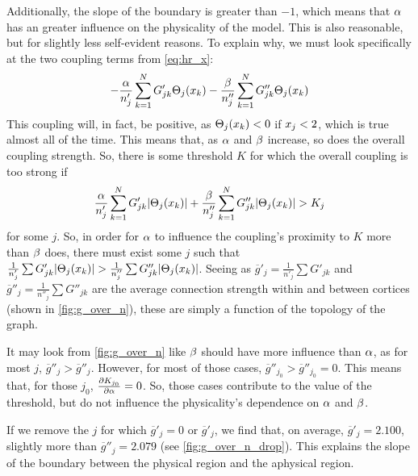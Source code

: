 Additionally, the slope of the boundary is greater than $-1$, which means that $\alpha$ has an greater influence on the physicality of the model.
This is also reasonable, but for slightly less self-evident reasons.
To explain why, we must look specifically at the two coupling terms from \cref{eq:hr_x}:
\[
  -\frac{\hra}{n'_{j}} \sum_{k = 1}^{N} G'_{j k} \Theta_{j}\pqty{\hrx_{k}}
  -
  \frac{\hrb}{n''_{j}} \sum_{k = 1}^{N} G''_{j k} \Theta_{j}\pqty{\hrx_{k}}
\]
This coupling will, in fact, be positive, as $\Theta_{j}\pqty{\hrx_{k}} < 0$ if $x_{j} < 2$, which is true almost all of the time.
This means that, as $\alpha$ and $\beta$ increase, so does the overall coupling strength.
So, there is some threshold $K$ for which the overall coupling is too strong if
\begin{equation}
  \label{eq:coupling_inequality}
  \frac{\hra}{n'_{j}} \sum_{k = 1}^{N} G'_{j k} \abs{\Theta_{j}\pqty{\hrx_{k}}}
  +
  \frac{\hrb}{n''_{j}} \sum_{k = 1}^{N} G''_{j k} \abs{\Theta_{j}\pqty{\hrx_{k}}}
  >
  K_{j}
\end{equation}
for some $j$.
So, in order for $\alpha$ to influence the coupling's proximity to $K$ more than $\beta$ does, there must exist some $j$ such that
$\frac{1}{n'_{j}} \sum G'_{j k} \abs{\Theta_{j}\pqty{\hrx_{k}}}
>
\frac{1}{n''_{j}} \sum G''_{j k} \abs{\Theta_{j}\pqty{\hrx_{k}}}$.
Seeing as $\overline{g}'_{j} = \frac{1}{n'_{j}} \sum G'_{j k}$ and $\overline{g}''_{j} = \frac{1}{n''_{j}} \sum G''_{j k}$ are the average connection strength within and between cortices (shown in \cref{fig:g_over_n}), these are simply a function of the topology of the graph.

It may look from \cref{fig:g_over_n} like $\beta$ should have more influence than $\alpha$, as for most $j$, $\overline{g}''_{j} > \overline{g}''_{j}$.
However, for most of those cases, $\overline{g}''_{j_{0}} > \overline{g}''_{j_{0}} = 0$.
This means that, for those $j_{0}$, $\pdv{K_{j_{0}}}{\alpha} = 0$.
So, those cases contribute to the value of the threshold, but do not influence the physicality's dependence on $\alpha$ and $\beta$.

If we remove the $j$ for which $\overline{g}'_{j} = 0$ or $\overline{g}'_{j}$, we find that, on average, $\overline{g}'_{j} = 2.100$, slightly more than $\overline{g}''_{j} = 2.079$ (see \cref{fig:g_over_n_drop}).
This explains the slope of the boundary between the physical region and the aphysical region.
